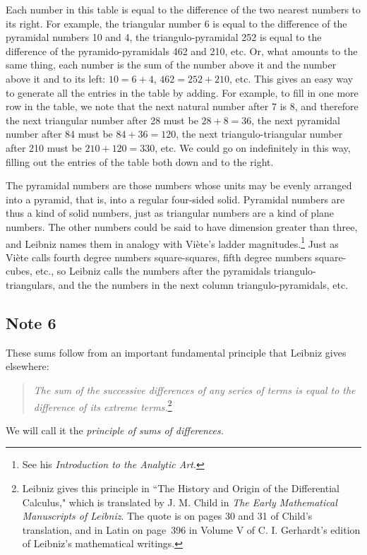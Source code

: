 \documentclass[polutonikogreek,english,twoside,openright]{article}
\begin{document}
Each number in this table is equal to the difference of the two nearest numbers to its right.  For example, the triangular number 6 is equal to the difference of the pyramidal numbers 10 and 4, the triangulo-pyramidal 252 is equal to the difference of the pyramido-pyramidals 462 and 210, etc.  Or, what amounts to the same thing, each number is the sum of the number above it and the number above it and to its left: $10= 6+4$, $462 = 252 + 210$, etc. This gives an easy way to generate all the entries in the table by adding.  For example, to fill in one more row in the table, we note that the next natural number after 7 is 8, and therefore the next triangular number after 28 must be $28+8 = 36$, the next pyramidal number after 84 must be $84 + 36 = 120$, the next triangulo-triangular number after 210  must be $210 + 120 = 330$, etc.  We could go on indefinitely in this way, filling out the entries of the table both down and to the right.

The pyramidal numbers are those numbers whose units may be evenly arranged into a pyramid, that is, into a regular four-sided solid.  Pyramidal numbers are thus a kind of solid numbers, just as triangular numbers are a kind of plane numbers.  The other numbers could be said to have dimension greater than three, and Leibniz names them in analogy with Vi\`{e}te's ladder magnitudes.\footnote{See his {\em Introduction to the Analytic Art}.}   Just as Vi\`{e}te calls fourth degree numbers square-squares, fifth degree numbers square-cubes, etc., so Leibniz calls the numbers after the pyramidals triangulo-triangulars, and the the numbers in the next column triangulo-pyramidals, etc.

\subsection*{Note 6}
\label{caa6}

\label{begsersum}These sums follow from an important fundamental principle that Leibniz gives elsewhere:
\begin{quote}\label{princsd}
{\em The sum of the successive differences of any series of terms is equal to the difference of its extreme terms.}\footnote{Leibniz gives this principle in ``The History and Origin of the Differential Calculus," which is translated by J. M. Child in {\em The Early Mathematical Manuscripts of Leibniz}.  The quote is on pages 30 and 31 of Child's translation, and in Latin on page~396 in Volume V of C. I. Gerhardt's edition of Leibniz's mathematical writings.}
\end{quote}
We will call it the {\em principle of sums of differences.}
\end{document}
